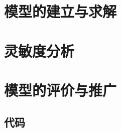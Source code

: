 \documentclass{cumcmthesis}
\begin{document}
\section{模型的建立与求解}

\section{灵敏度分析}

\section{模型的评价与推广}

\begin{thebibliography}{99}%


\end{thebibliography}

\begin{appendices}

\section{代码}
%

\end{appendices}
\end{document}
